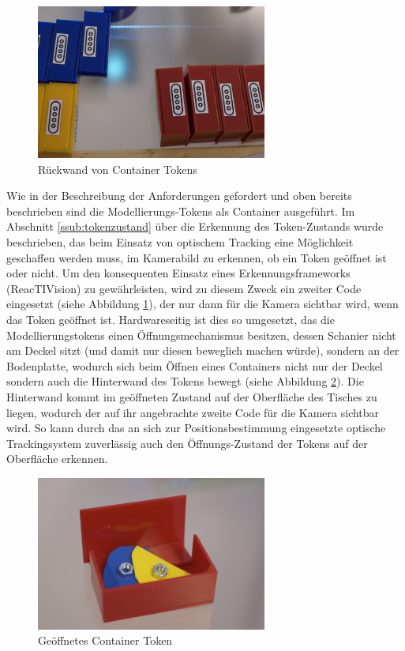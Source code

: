 \begin{figure}[htbp]
	\centering
		\includegraphics[height=2in]{img/ImplementierungInput/ContainerRueckseite.jpg}
	\caption{Rückwand von Container Tokens}
	\label{fig:img_ImplementierungInput_ContainerRueckseite}
\end{figure}

Wie in der Beschreibung der Anforderungen gefordert und oben bereits beschrieben sind die Modellierungs-Tokens als Container ausgeführt. Im Abschnitt \ref{ssub:tokenzustand} über die Erkennung des Token-Zustands wurde beschrieben, das beim Einsatz von optischem Tracking eine Möglichkeit geschaffen werden muss, im Kamerabild zu erkennen, ob ein Token geöffnet ist oder nicht. Um den konsequenten Einsatz eines Erkennungsframeworks (ReacTIVision) zu gewährleisten, wird zu diesem Zweck ein zweiter Code eingesetzt (siehe Abbildung \ref{fig:img_ImplementierungInput_ContainerRueckseite}), der nur dann für die Kamera sichtbar wird, wenn das Token geöffnet ist. Hardwareseitig ist dies so umgesetzt, das die Modellierungstokens einen Öffnungsmechanismus besitzen, dessen Schanier nicht am Deckel sitzt (und damit nur diesen beweglich machen würde), sondern an der Bodenplatte, wodurch sich beim Öffnen eines Containers nicht nur der Deckel sondern auch die Hinterwand des Tokens bewegt (siehe Abbildung \ref{fig:img_ImplementierungInput_ContainerToken}). Die Hinterwand kommt im geöffneten Zustand auf der Oberfläche des Tisches zu liegen, wodurch der auf ihr angebrachte zweite Code für die Kamera sichtbar wird. So kann durch das an sich zur Positionsbestimmung eingesetzte optische Trackingsystem zuverlässig auch den Öffnungs-Zustand der Tokens auf der Oberfläche erkennen.

\begin{figure}[htbp]
	\centering
		\includegraphics[height=2in]{img/ImplementierungInput/ContainerToken.jpg}
	\caption{Geöffnetes Container Token}
	\label{fig:img_ImplementierungInput_ContainerToken}
\end{figure}

